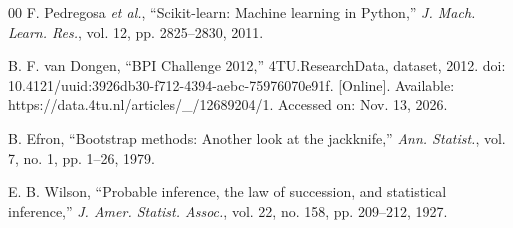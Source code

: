 \documentclass[journal]{IEEEtran}
\begin{document}
\begin{thebibliography}{00}
 F. Pedregosa \textit{et al.}, ``Scikit-learn: Machine learning in Python,'' \textit{J. Mach. Learn. Res.}, vol. 12, pp. 2825--2830, 2011.

 B. F. van Dongen, ``BPI Challenge 2012,'' 4TU.ResearchData, dataset, 2012. doi: 10.4121/uuid:3926db30-f712-4394-aebc-75976070e91f. [Online]. Available: https://data.4tu.nl/articles/\_/12689204/1. Accessed on: Nov. 13, 2026.

 B. Efron, ``Bootstrap methods: Another look at the jackknife,'' \textit{Ann. Statist.}, vol. 7, no. 1, pp. 1--26, 1979.

 E. B. Wilson, ``Probable inference, the law of succession, and statistical inference,'' \textit{J. Amer. Statist. Assoc.}, vol. 22, no. 158, pp. 209--212, 1927.
\end{thebibliography}
\end{document}
